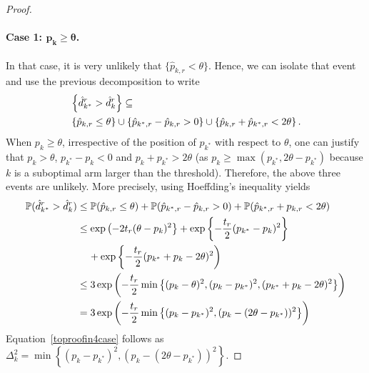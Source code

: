 \begin{proof}
\paragraph{Case 1: $\bm{p_k \geq \theta}$.} In that case, it is very unlikely that $\{\hat{p}_{k,r} < \theta\}$. Hence, we can isolate that event and use the previous decomposition to write
\begin{align*}
&\Set{\hat{d}^r_{k^*} > \hat{d}^r_k} \subseteq 
\\
&\Set{\hat{p}_{k,r} \le \theta} \cup \Set{\hat{p}_{{k^*},r} - \hat{p}_{k,r} > 0}
		\cup \Set{\hat{p}_{k,r} + \hat{p}_{{k^*},r} < 2\theta}
		.
\end{align*}
When $p_k \geq \theta$, irrespective of the position of $p_{k^*}$ with respect to $\theta$, one can justify that $p_k > \theta$, $p_{k^*} - p_{k} < 0$ and ${p}_{k} + {p}_{{k^*}} > 2\theta$ (as $p_k \geq \max(p_{k^*},2\theta - p_{k^*})$ because $k$ is a suboptimal arm larger than the threshold). Therefore, the above three events are unlikely. More precisely, using Hoeffding's inequality yields  
\begin{align*}
\mathbb{P}(\hat{d}^r_{k^*} > \hat{d}^r_k) 
 &\leq 
	\mathbb{P}(\hat{p}_{k,r} \le \theta)
	+ \mathbb{P}(\hat{p}_{{k^*},r} - \hat{p}_{k,r} > 0)
	+ \mathbb{P}(\hat{p}_{k^*,r} + p_{k,r} < 2\theta)
\\ &\leq 
	\exp\left( -2t_r (\theta - p_k)^2 \right\}
	+ \exp\left\{ - \frac{t_r}{2} (p_{k^*} - p_k)^2 \right\}
\\
	& \hspace{0.4cm} + \exp\left\{ - \frac{t_r}{2} (p_{k^*} + p_k - 2\theta )^2 \right)
\\ &\leq 
	3 \exp\left( -\frac{t_r}{2} \min\left\{(p_{k} - \theta)^2,
		(p_{k} - p_{k^*})^2,
		(p_{k^*}+ p_k - 2\theta)^2
	  \right\} \right)
\\ & = 
	3 \exp\left( -\frac{t_r}{2} \min\left\{
		(p_{k} - p_{k^*})^2,
		(p_{k} - (2\theta - p_{k^*}))^2
	  \right\} \right)
\end{align*}
Equation~\eqref{toproofin4case} follows as $\Delta_k^2 = \min\left\{
		(p_{k} - p_{k^*})^2,
		(p_{k} - (2\theta - p_{k^*}))^2
	  \right\}$. 


\end{proof}
